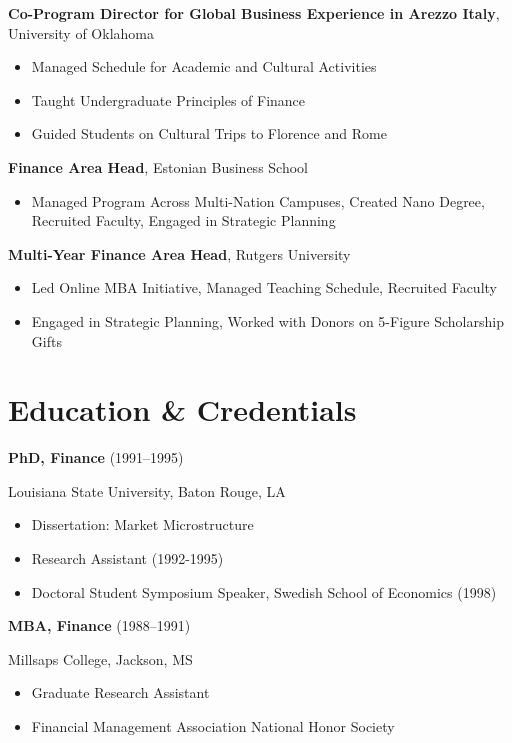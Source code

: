 \documentclass[11pt,a4paper,]{awesome-cv}
\begin{document}
\textbf{Co-Program Director for Global Business Experience in Arezzo Italy},
University of Oklahoma

\begin{itemize}
\item Managed Schedule for Academic and Cultural Activities
\item Taught Undergraduate Principles of Finance
\item Guided Students on Cultural Trips to Florence and Rome
\end{itemize}

\textbf{Finance Area Head}, Estonian Business School

\begin{itemize}
\item Managed Program Across Multi-Nation Campuses, Created Nano Degree, Recruited Faculty, Engaged in Strategic Planning
\end{itemize}

\textbf{Multi-Year Finance Area Head}, Rutgers University

\begin{itemize}
\item Led Online MBA Initiative, Managed Teaching Schedule, Recruited Faculty
\item Engaged in Strategic Planning, Worked with Donors on 5-Figure Scholarship Gifts
\end{itemize}

\section{Education \& Credentials}\label{education-credentials}

\textbf{PhD, Finance} (1991--1995)

Louisiana State University, Baton Rouge, LA

\begin{itemize}
\item Dissertation: Market Microstructure
\item Research Assistant (1992-1995)
\item Doctoral Student Symposium Speaker, Swedish School of Economics (1998)
\end{itemize}

\textbf{MBA, Finance} (1988--1991)

Millsaps College, Jackson, MS

\begin{itemize}
\item Graduate Research Assistant
\item Financial Management Association National Honor Society
\end{itemize}
\end{document}
